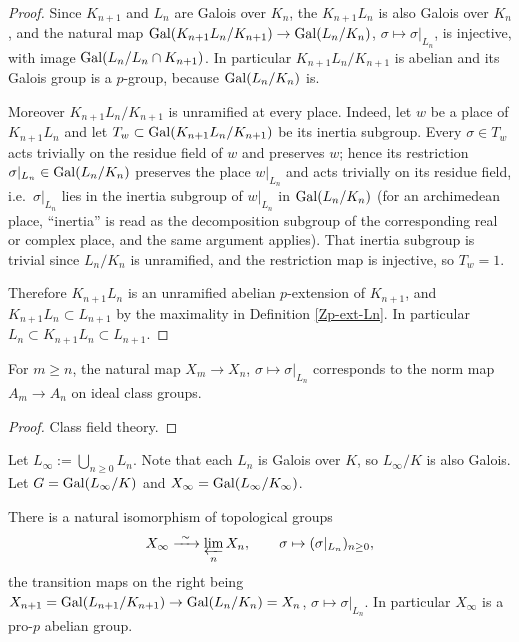 \begin{proof}
\leanok
Since $K_{n+1}$ and $L_n$ are Galois over $K_n$,
the $K_{n+1}L_n$ is also Galois over $K_n$,
and the natural map
${\mathrm{Gal}}(K_{n+1}L_n/K_{n+1})\to{\mathrm{Gal}}(L_n/K_n)$, $\sigma\mapsto\sigma|_{L_n}$,
is injective, with image ${\mathrm{Gal}}(L_n/L_n\cap K_{n+1})$.
In particular $K_{n+1}L_n/K_{n+1}$ is abelian and its Galois group is a
$p$-group, because ${\mathrm{Gal}}(L_n/K_n)$ is.

Moreover $K_{n+1}L_n/K_{n+1}$ is unramified at every place.
Indeed, let $w$ be a place of $K_{n+1}L_n$ and let $T_w\subset
{\mathrm{Gal}}(K_{n+1}L_n/K_{n+1})$ be its inertia subgroup.
Every $\sigma\in T_w$ acts trivially on the residue field of $w$ and preserves
$w$; hence its restriction $\sigma|_{L_n}\in{\mathrm{Gal}}(L_n/K_n)$ preserves the place
$w|_{L_n}$ and acts trivially on its residue field, i.e.~$\sigma|_{L_n}$ lies in
the inertia subgroup of $w|_{L_n}$ in ${\mathrm{Gal}}(L_n/K_n)$
(for an archimedean place, ``inertia'' is read as the decomposition subgroup of
the corresponding real or complex place, and the same argument applies).
That inertia subgroup is trivial since $L_n/K_n$ is unramified, and the
restriction map is injective, so $T_w=1$.

Therefore $K_{n+1}L_n$ is an unramified abelian $p$-extension of $K_{n+1}$,
and $K_{n+1}L_n\subset L_{n+1}$ by the maximality in Definition
\ref{Zp-ext-Ln}. In particular $L_n\subset K_{n+1}L_n\subset L_{n+1}$.
\end{proof}

\begin{prop}
\label{Xn-map-eq-An-map}
For $m\geq n$, the natural map $X_m\to X_n$, $\sigma\mapsto\sigma|_{L_n}$
corresponds to the norm map $A_m\to A_n$ on ideal class groups.
\end{prop}

\begin{proof}
Class field theory.
\end{proof}

\begin{definition}
\label{Zp-ext-L-inf}
\leanok
Let $L_\infty:=\bigcup_{n\geq 0}L_n$.
Note that each $L_n$ is Galois over $K$, so $L_\infty/K$ is also Galois.
Let $G={\mathrm{Gal}}(L_\infty/K)$ and $X_\infty={\mathrm{Gal}}(L_\infty/K_\infty)$.
\end{definition}

\begin{lem}
\label{X-inf-is-proj-lim}
There is a natural isomorphism of topological groups
$$X_\infty\xrightarrow{\ \sim\ }\varprojlim_n X_n,\qquad
\sigma\mapsto(\sigma|_{L_n})_{n\geq 0},$$
the transition maps on the right being
$X_{n+1}={\mathrm{Gal}}(L_{n+1}/K_{n+1})\to{\mathrm{Gal}}(L_n/K_n)=X_n$,
$\sigma\mapsto\sigma|_{L_n}$.
In particular $X_\infty$ is a pro-$p$ abelian group.
\end{lem}

